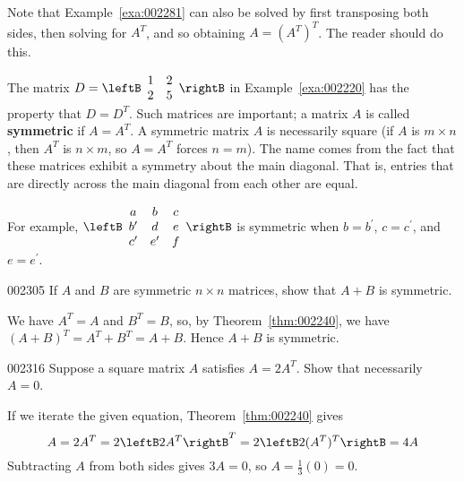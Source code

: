 \noindent Note that Example~\ref{exa:002281} can also be solved by first transposing both sides, then solving for $A^{T}$, and so obtaining $A = (A^{T})^{T}$. The reader should do this.

The matrix $D = \leftB \begin{array}{rr}
1 & 2 \\
2 & 5 \end{array}\rightB$ in Example~\ref{exa:002220} has the property that $D = D^{T}$. Such matrices are important; a matrix $A$ is called \textbf{symmetric} if $A = A^{T}$. A symmetric matrix $A$ is necessarily square (if $A$ is $m \times n$, then $A^{T}$ is $n \times m$, so $A = A^{T}$ forces $n = m$). The name comes from the fact that these matrices exhibit a symmetry about the main diagonal. That is, entries that are directly across the main diagonal from each other are equal.

For example, $\leftB \begin{array}{ccc}
a & b & c \\
b^\prime & d & e \\
c^\prime & e^\prime & f
\end{array} \rightB$ is symmetric when $b = b^\prime$, $c = c^\prime$, and $e = e^\prime$.


\begin{example}{}{002305}
If $A$ and $B$ are symmetric $n \times n$ matrices, show that $A + B$ is symmetric.


\begin{solution}
  We have $A^{T} = A$ and $B^{T} = B$, so, by Theorem~\ref{thm:002240}, we have $(A + B)^{T} = A^{T} + B^{T} = A + B$. Hence $A + B$ is symmetric.
\end{solution}
\end{example}

\begin{example}{}{002316}
Suppose a square matrix $A$ satisfies $A = 2A^{T}$. Show that necessarily $A = 0$.


\begin{solution}
  If we iterate the given equation, Theorem~\ref{thm:002240} gives
\begin{equation*}
A = 2A^{T} = 2 {\leftB 2A^{T} \rightB}^T = 2 \leftB 2(A^{T})^{T} \rightB = 4A
\end{equation*}
Subtracting $A$ from both sides gives $3A = 0$, so $A = \frac{1}{3}(0) = 0$.
\end{solution}
\end{example}
